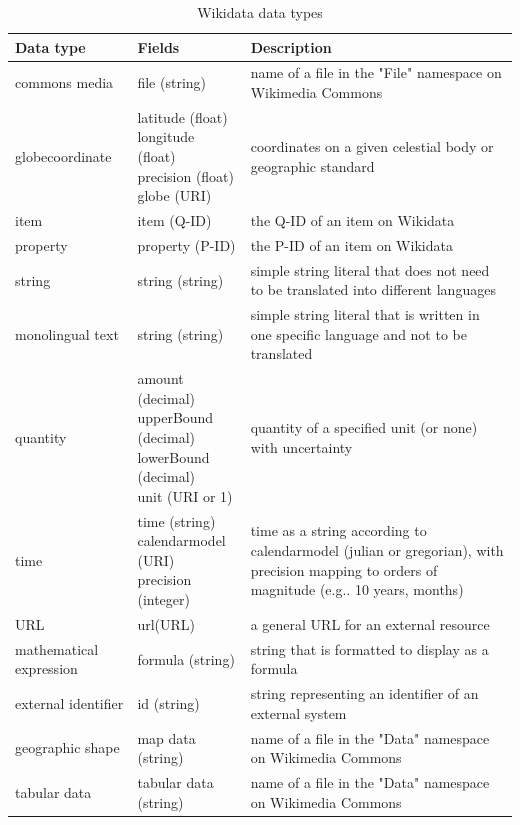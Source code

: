 \documentclass[hyperref,bachelorofscience,fleqn]{cgvpub}
\begin{document}
\begin{table}[H]
\caption{Wikidata data types}\label{tab_datatypes}
\begin{tabularx}{\textwidth}{llp{8.5cm}}
Data type & Fields & Description \\
\hline
commons media & file (string) & name of a file in the "File" namespace on Wikimedia Commons \\
globecoordinate & \makecell{latitude (float) \\ longitude (float) \\ precision (float) \\ globe (URI)} & coordinates on a given celestial body or geographic standard \\
item & item (Q-ID) & the Q-ID of an item on Wikidata \\
property & property (P-ID) & the P-ID of an item on Wikidata \\
string & string (string) & simple string literal that does not need to be translated into different languages \\
monolingual text & string (string) & simple string literal that is written in one specific language and not to be translated \\
quantity & \makecell {amount (decimal) \\ upperBound (decimal) \\ lowerBound (decimal) \\ unit (URI or 1)} & quantity of a specified unit (or none) with uncertainty \\
time & \makecell {time (string) \\ calendarmodel (URI) \\ precision (integer)} & time as a string according to calendarmodel (julian or gregorian), with precision mapping to orders of magnitude (e.g.. 10 years, months) \\
URL & url(URL) & a general URL for an external resource \\
mathematical expression & formula (string) & string that is formatted to display as a formula \\
external identifier & id (string) & string representing an identifier of an external system \\
geographic shape & map data (string) & name of a file in the "Data" namespace on Wikimedia Commons \\
tabular data & tabular data (string) & name of a file in the "Data" namespace on Wikimedia Commons \\
\end{tabularx}
\end{table}
\end{document}
